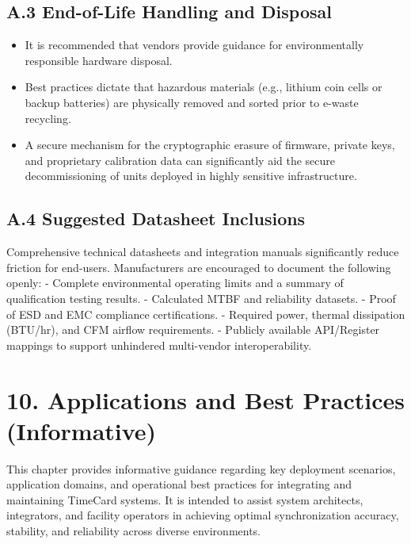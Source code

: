 \subsection{A.3 End-of-Life Handling and
Disposal}\label{a.3-end-of-life-handling-and-disposal}

\begin{itemize}
\tightlist
\item
  It is recommended that vendors provide guidance for environmentally
  responsible hardware disposal.
\item
  Best practices dictate that hazardous materials (e.g., lithium coin
  cells or backup batteries) are physically removed and sorted prior to
  e-waste recycling.
\item
  A secure mechanism for the cryptographic erasure of firmware, private
  keys, and proprietary calibration data can significantly aid the
  secure decommissioning of units deployed in highly sensitive
  infrastructure.
\end{itemize}

\subsection{A.4 Suggested Datasheet
Inclusions}\label{a.4-suggested-datasheet-inclusions}

Comprehensive technical datasheets and integration manuals significantly
reduce friction for end-users. Manufacturers are encouraged to document
the following openly: - Complete environmental operating limits and a
summary of qualification testing results. - Calculated MTBF and
reliability datasets. - Proof of ESD and EMC compliance certifications.
- Required power, thermal dissipation (BTU/hr), and CFM airflow
requirements. - Publicly available API/Register mappings to support
unhindered multi-vendor interoperability.

\section{10. Applications and Best Practices
(Informative)}\label{applications-and-best-practices-informative}

This chapter provides informative guidance regarding key deployment
scenarios, application domains, and operational best practices for
integrating and maintaining TimeCard systems. It is intended to assist
system architects, integrators, and facility operators in achieving
optimal synchronization accuracy, stability, and reliability across
diverse environments.

